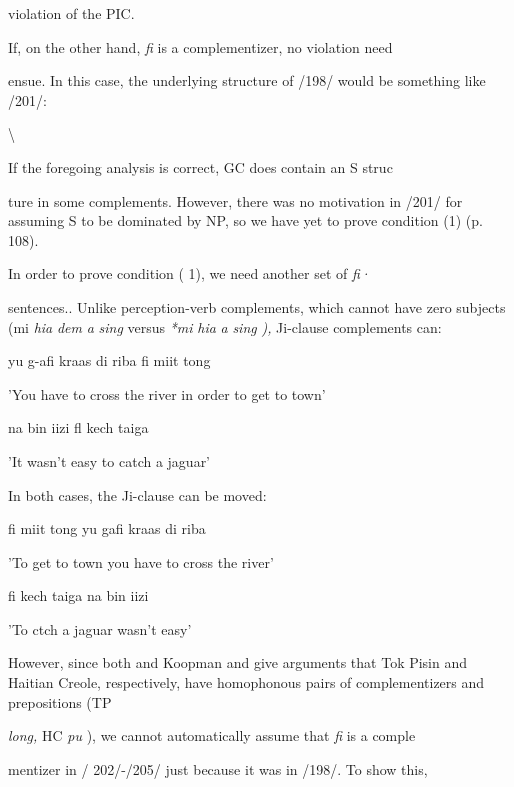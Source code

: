 violation of the PIC.

If, on the other hand, \textit{fi} is a complementizer, no violation need

ensue. In this case, the underlying structure of /198/ would be some\-thing like /201/:

{\textbackslash}

If the foregoing analysis is correct, GC does contain an S struc\-

ture in some complements. However, there was no motivation in /201/ for assuming S to be dominated by NP, so we have yet to prove condi\-tion (1) (p. 108).

In order to prove condition ( 1), we need another set of \textit{f}\textit{i}\textit{·}

sentences.. Unlike perception-verb complements, which cannot have zero subjects (mi \textit{hia} \textit{dem} \textit{a} \textit{sing} versus \textit{*mi} \textit{hia} \textit{a} \textit{sing} \textit{),} Ji{}-clause comple\-ments can:

\ea\label{ex:202}
 yu g{}-afi kraas di riba fi miit tong
\glt
\z

'You have to cross the river in order to get to town'



\ea\label{ex:203}
 na bin iizi fl kech taiga
\glt
\z

'It wasn't easy to catch a jaguar'

In both cases, the Ji-clause can be moved:

\ea\label{ex:204}
 fi miit tong yu gafi kraas di riba
\glt
\z

'To get to town you have to cross the river'

\ea\label{ex:205}
 fi kech taiga na bin iizi
\glt
\z

'To ctch a jaguar wasn't easy'

However, since both \citet{Woolford1979} and Koopman and \citet{Lefebvre1981} give arguments that Tok Pisin and Haitian Creole, respectively, have homophonous pairs of complementizers and prepositions (TP

\textit{long,} HC \textit{pu} ), we cannot automatically assume that \textit{fi} is a comple\-

mentizer in / 202/-/205/ just because it was in /198/. To show this,

\ea\label{ex:207}

\glt
\z

